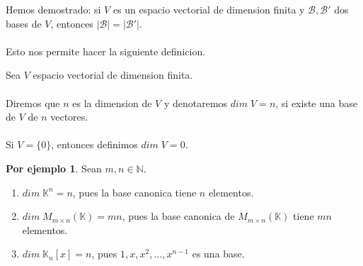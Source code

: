 \documentclass{article}
\theoremstyle{definition}
\theoremstyle{definition}
\newtheorem*{ej}{Por ejemplo}
\theoremstyle{remark}
\begin{document}
Hemos demostrado: si $V$ es un espacio vectorial de dimension finita y $\mathcal{B}, \mathcal{B}'$ dos bases de $V$, entonces $|\mathcal{B}|=|\mathcal{B}'|$. \\\\ Esto nos permite hacer la siguiente definicion.\begin{defi}
                          Sea $V$ espacio vectorial de dimension finita. \\\\ Diremos que $n$ es la dimension de $V$ y denotaremos $dim \; V = n$, si existe una base de $V$ de $n$ vectores. \\\\ Si $V=\{0\}$, entonces definimos $dim \; V = 0$.
                        \end{defi}
                        \begin{ej}
                          Sean $m,n \in \mathbb{N}$. \begin{enumerate}[label=(\arabic*)]
                            \item $dim \; \mathbb{K}^n=n$, pues la base canonica tiene $n$ elementos. 
                            \item $dim \; M_{m \times n}(\mathbb{K})=mn$, pues la base canonica de $M_{m \times n}(\mathbb{K})$ tiene $mn$ elementos. 
                            \item $dim \; \mathbb{K}_{n}[x]=n$, pues $1,x,x^2,\dots ,x^{n-1}$ es una base.
                          \end{enumerate}
                        \end{ej}
\end{document}
